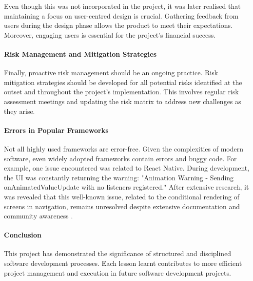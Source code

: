 Even though this was not incorporated in the project, it was later realised that maintaining a focus on user-centred design is crucial. Gathering feedback from users during the design phase allows the product to meet their expectations. Moreover, engaging users is essential for the project's financial success.

\paragraph{Risk Management and Mitigation Strategies}

Finally, proactive risk management should be an ongoing practice. Risk mitigation strategies should be developed for all potential risks identified at the outset and throughout the project's implementation. This involves regular risk assessment meetings and updating the risk matrix to address new challenges as they arise. 

\paragraph{Errors in Popular Frameworks}

Not all highly used frameworks are error-free. Given the complexities of modern software, even widely adopted frameworks contain errors and buggy code. For example, one issue encountered was related to React Native. During development, the UI was constantly returning the warning: "Animation Warning - Sending onAnimatedValueUpdate with no listeners registered." After extensive research, it was revealed that this well-known issue, related to the conditional rendering of screens in navigation, remains unresolved despite extensive documentation and community awareness \cite{GithubAnimatedViewWarning, StackOverFlowAnimatedViewWarning}.

\paragraph{Conclusion}

This project has demonstrated the significance of structured and disciplined software development processes. Each lesson learnt contributes to more efficient project management and execution in future software development projects.

